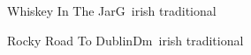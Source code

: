 \begin{song}{Whiskey In The Jar}{G}{~}{irish traditional}{}{}
	
\end{song}

\begin{song}{Rocky Road To Dublin}{Dm}{~}{irish traditional}{}{}
	
\end{song}

